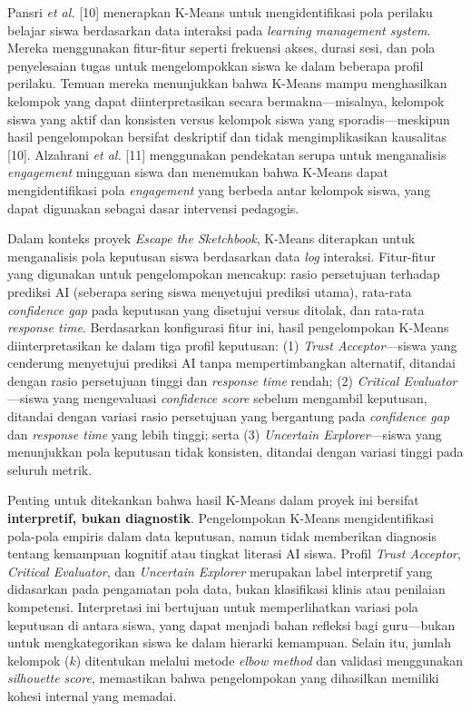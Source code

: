 \documentclass[10pt,twoside,openright]{report}
\begin{document}
Pansri \textit{et al.} [10] menerapkan K-Means untuk mengidentifikasi pola perilaku belajar siswa berdasarkan data interaksi pada \textit{learning management system}. Mereka menggunakan fitur-fitur seperti frekuensi akses, durasi sesi, dan pola penyelesaian tugas untuk mengelompokkan siswa ke dalam beberapa profil perilaku. Temuan mereka menunjukkan bahwa K-Means mampu menghasilkan kelompok yang dapat diinterpretasikan secara bermakna—misalnya, kelompok siswa yang aktif dan konsisten versus kelompok siswa yang sporadis—meskipun hasil pengelompokan bersifat deskriptif dan tidak mengimplikasikan kausalitas [10]. Alzahrani \textit{et al.} [11] menggunakan pendekatan serupa untuk menganalisis \textit{engagement} mingguan siswa dan menemukan bahwa K-Means dapat mengidentifikasi pola \textit{engagement} yang berbeda antar kelompok siswa, yang dapat digunakan sebagai dasar intervensi pedagogis.

Dalam konteks proyek \textit{Escape the Sketchbook}, K-Means diterapkan untuk menganalisis pola keputusan siswa berdasarkan data \textit{log} interaksi. Fitur-fitur yang digunakan untuk pengelompokan mencakup: rasio persetujuan terhadap prediksi AI (seberapa sering siswa menyetujui prediksi utama), rata-rata \textit{confidence gap} pada keputusan yang disetujui versus ditolak, dan rata-rata \textit{response time}. Berdasarkan konfigurasi fitur ini, hasil pengelompokan K-Means diinterpretasikan ke dalam tiga profil keputusan: (1) \textit{Trust Acceptor}—siswa yang cenderung menyetujui prediksi AI tanpa mempertimbangkan alternatif, ditandai dengan rasio persetujuan tinggi dan \textit{response time} rendah; (2) \textit{Critical Evaluator}—siswa yang mengevaluasi \textit{confidence score} sebelum mengambil keputusan, ditandai dengan variasi rasio persetujuan yang bergantung pada \textit{confidence gap} dan \textit{response time} yang lebih tinggi; serta (3) \textit{Uncertain Explorer}—siswa yang menunjukkan pola keputusan tidak konsisten, ditandai dengan variasi tinggi pada seluruh metrik.

Penting untuk ditekankan bahwa hasil K-Means dalam proyek ini bersifat \textbf{interpretif, bukan diagnostik}. Pengelompokan K-Means mengidentifikasi pola-pola empiris dalam data keputusan, namun tidak memberikan diagnosis tentang kemampuan kognitif atau tingkat literasi AI siswa. Profil \textit{Trust Acceptor}, \textit{Critical Evaluator}, dan \textit{Uncertain Explorer} merupakan label interpretif yang didasarkan pada pengamatan pola data, bukan klasifikasi klinis atau penilaian kompetensi. Interpretasi ini bertujuan untuk memperlihatkan variasi pola keputusan di antara siswa, yang dapat menjadi bahan refleksi bagi guru—bukan untuk mengkategorikan siswa ke dalam hierarki kemampuan. Selain itu, jumlah kelompok ($k$) ditentukan melalui metode \textit{elbow method} dan validasi menggunakan \textit{silhouette score}, memastikan bahwa pengelompokan yang dihasilkan memiliki kohesi internal yang memadai.
\end{document}
